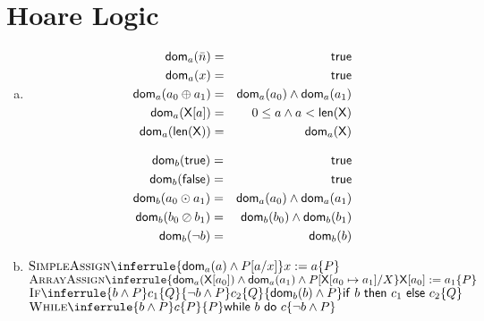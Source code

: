\section{Hoare Logic}

\newcommand{\dom}{{\sf dom}}
\newcommand{\ifstmt}[3]{{\sf if}~#1~{\sf then}~#2~{\sf else}~#3}
\newcommand{\whilestmt}[2]{{\sf while}~#1~{\sf do}~#2}

\begin{enumerate}[(a)]
\item \begin{eqnarray*}
    \dom_a(\bar{n})        & = & {\sf true} \\
    \dom_a(x)              & = & {\sf true} \\
    \dom_a(a_0 \oplus a_1) & = & \dom_a(a_0) \wedge \dom_a(a_1) \\
    \dom_a({\sf X}[a])     & = & 0 \leq a \wedge a < {\sf len(X)} \\
    \dom_a({\sf len(X)})   & = & \dom_a({\sf X})
\end{eqnarray*}

\begin{eqnarray*}
    \dom_b({\sf true})      & = & {\sf true} \\
    \dom_b({\sf false})     & = & {\sf true} \\
    \dom_b(a_0 \odot a_1)   & = & \dom_a(a_0) \wedge \dom_a(a_1) \\
    \dom_b(b_0 \oslash b_1) & = & \dom_b(b_0) \wedge \dom_b(b_1) \\
    \dom_b(\neg b)          & = & \dom_b(b) \\
\end{eqnarray*}

\item
$
\Rule{SimpleAssign}{}{
    \{ \dom_a(a) \wedge P[a / x]\}
    x := a
    \{ P \}
}
$
\\

$
\Rule{ArrayAssign}{}{
    \{ \dom_a({\sf X}[a_0]) \wedge \dom_a(a_1) \wedge P[{\sf X}[a_0 \mapsto a_1] / X \}
    {\sf X}[a_0] := a_1
    \{ P \}
}
$
\\

$
\Rule{If}{
    \{ b \wedge P \}
    c_1
    \{ Q \}
    \\
    \{ \neg b \wedge P \}
    c_2
    \{ Q \}
}{
    \{ \dom_b(b) \wedge P \}
    \ifstmt{b}{c_1}{c_2}
    \{ Q \}
}
$
\\

$\Rule{While}{
    \{ b \wedge P \}
    c
    \{ P \}
}{
    \{ P \}
    \whilestmt{b}{c}
    \{ \neg b \wedge P \}
}$


\end{enumerate}
